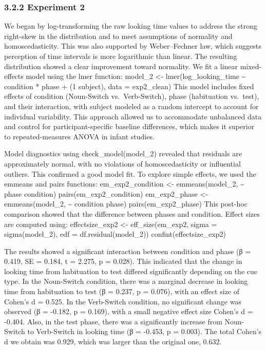 \documentclass[
  man]{apa6}
\begin{document}
\subsubsection{3.2.2 Experiment 2}\label{experiment-2-1}

We began by log-transforming the raw looking time values to address the strong right-skew in the distribution and to meet assumptions of normality and homoscedasticity. This was also supported by Weber--Fechner law, which suggests perception of time intervals is more logarithmic than linear. The resulting distribution showed a clear improvement toward normality.
We fit a linear mixed-effects model using the lmer function:
model\_2 \textless- lmer(log\_looking\_time \textasciitilde{} condition * phase
+ (1 \textbar{} subject), data = exp2\_clean)
This model includes fixed effects of condition (Noun-Switch vs.~Verb-Switch), phase (habituation vs.~test), and their interaction, with subject modeled as a random intercept to account for individual variability. This approach allowed us to accommodate unbalanced data and control for participant-specific baseline differences, which makes it superior to repeated-measures ANOVA in infant studies.

Model diagnostics using check\_model(model\_2) revealed that residuals are approximately normal, with no violations of homoscedasticity or influential outliers. This confirmed a good model fit.
To explore simple effects, we used the emmeans and pairs functions:
em\_exp2\_condition \textless- emmeans(model\_2, \textasciitilde{} phase \textbar{} condition)
pairs(em\_exp2\_condition)
em\_exp2\_phase \textless- emmeans(model\_2, \textasciitilde{} condition \textbar{} phase)
pairs(em\_exp2\_phase)
This post-hoc comparison showed that the difference between phases and condition. Effect sizes are computed using:
effectsize\_exp2 \textless- eff\_size(em\_exp2, sigma = sigma(model\_2),
edf = df.residual(model\_2))
confint(effectsize\_exp2)

The results showed a significant interaction between condition and phase (β = 0.419, SE = 0.184, t = 2.275, p = 0.028). This indicated that the change in looking time from habituation to test differed significantly depending on the cue type. In the Noun-Switch condition, there was a marginal decrease in looking time from habituation to test (β = 0.237, p = 0.076), with an effect size of Cohen's d = 0.525. In the Verb-Switch condition, no significant change was observed (β = -0.182, p = 0.169), with a small negative effect size Cohen's d = -0.404. Also, in the test phase, there was a significantly increase from Noun-Switch to Verb-Switch in looking time (β = -0.453, p = 0.003). The total Cohen's d we obtain was 0.929, which was larger than the original one, 0.632.
\end{document}
